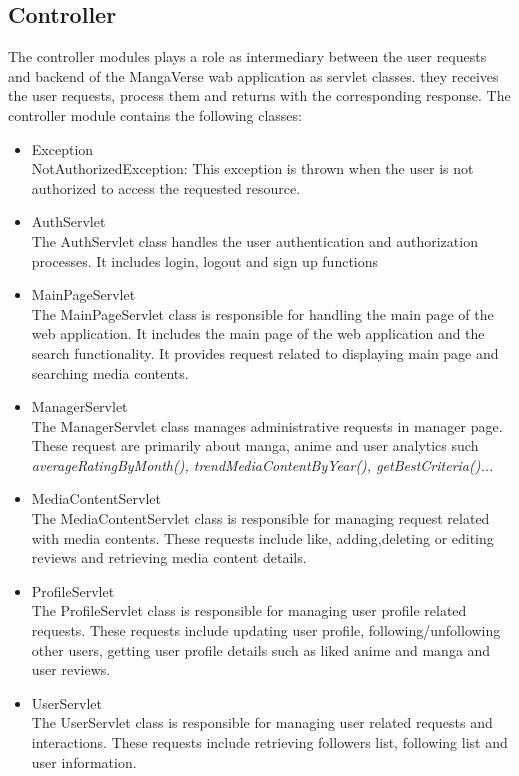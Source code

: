 \subsection*{Controller}
The controller modules plays a role as intermediary between the user requests and backend of the MangaVerse wab application as servlet classes.
they receives the user requests, process them and returns with the corresponding response. The controller module contains the following classes:
\begin{itemize}
    \item Exception \\
    NotAuthorizedException: This exception is thrown when the user is not authorized to access the requested resource.
    \item AuthServlet \\
    The AuthServlet class handles the user authentication and authorization processes. It includes login, logout and sign up functions
    \item MainPageServlet \\
    The MainPageServlet class is responsible for handling the main page of the web application. It includes the main page of the web application and the search functionality.
    It provides request related to displaying main page and searching media contents.
    \item ManagerServlet \\
    The ManagerServlet class manages administrative requests in manager page. These request are primarily about manga, anime and user analytics such \textit{averageRatingByMonth(), trendMediaContentByYear(), getBestCriteria()...}
    \item MediaContentServlet \\
    The MediaContentServlet class is responsible for managing request related with media contents. These requests include like, adding,deleting or editing reviews and retrieving media content details. 
    \item ProfileServlet \\
    The ProfileServlet class is responsible for managing user profile related requests. These requests include updating user profile, following/unfollowing other users, getting user profile details such as liked anime and manga and user reviews.
    \item UserServlet \\
    The UserServlet class is responsible for managing user related requests and interactions. These requests include retrieving followers list, following list and user information. 
\end{itemize}

